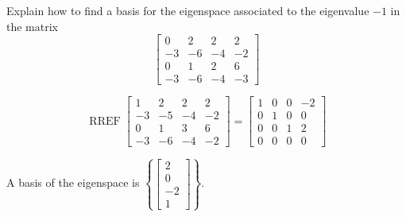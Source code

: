 
\begin{exerciseStatement}


Explain how to find a basis for the eigenspace associated to the eigenvalue \( -1 \) in the matrix \[ \left[\begin{array}{cccc}
0 & 2 & 2 & 2 \\
-3 & -6 & -4 & -2 \\
0 & 1 & 2 & 6 \\
-3 & -6 & -4 & -3
\end{array}\right] \]


\end{exerciseStatement}
    
\begin{exerciseAnswer} 


\[\operatorname{RREF} \left[\begin{array}{cccc}
1 & 2 & 2 & 2 \\
-3 & -5 & -4 & -2 \\
0 & 1 & 3 & 6 \\
-3 & -6 & -4 & -2
\end{array}\right] = \left[\begin{array}{cccc}
1 & 0 & 0 & -2 \\
0 & 1 & 0 & 0 \\
0 & 0 & 1 & 2 \\
0 & 0 & 0 & 0
\end{array}\right] \]



A basis of the eigenspace is \( \left\{ \left[\begin{array}{c}
2 \\
0 \\
-2 \\
1
\end{array}\right] \right\} \).


\end{exerciseAnswer}
    
